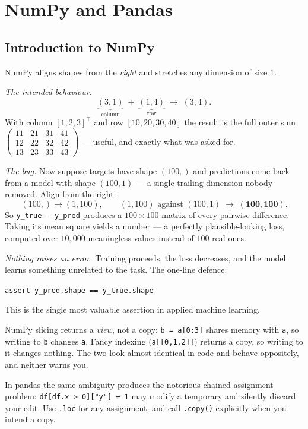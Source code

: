 \section{NumPy and Pandas}
\subsection{Introduction to NumPy}

\begin{workedexample}
NumPy aligns shapes from the \emph{right} and stretches any dimension of size
$1$.

\emph{The intended behaviour.}
\[
  \underbrace{(3,1)}_{\text{column}} \;+\; \underbrace{(1,4)}_{\text{row}}
  \;\longrightarrow\; (3,4).
\]
With column $[1,2,3]^{\!\top}$ and row $[10,20,30,40]$ the result is the full
outer sum
$\left(\begin{smallmatrix}11&21&31&41\\12&22&32&42\\13&23&33&43
\end{smallmatrix}\right)$ --- useful, and exactly what was asked for.

\emph{The bug.} Now suppose targets have shape $(100,)$ and predictions come
back from a model with shape $(100,1)$ --- a single trailing dimension nobody
removed. Align from the right:
\[
  (100,) \rightarrow (1,100),
  \qquad
  (1,100) \text{ against } (100,1)
  \;\longrightarrow\; \mathbf{(100,100)} .
\]
So \texttt{y\_true - y\_pred} produces a $100\times100$ matrix of every
pairwise difference. Taking its mean square yields a number --- a perfectly
plausible-looking loss, computed over $10{,}000$ meaningless values instead of
$100$ real ones.

\emph{Nothing raises an error.} Training proceeds, the loss decreases, and the
model learns something unrelated to the task. The one-line defence:
\begin{center}
\texttt{assert y\_pred.shape == y\_true.shape}
\end{center}
This is the single most valuable assertion in applied machine learning.
\end{workedexample}

\begin{cautionbox}
NumPy slicing returns a \emph{view}, not a copy: \texttt{b = a[0:3]} shares
memory with \texttt{a}, so writing to \texttt{b} changes \texttt{a}. Fancy
indexing (\texttt{a[[0,1,2]]}) returns a copy, so writing to it changes
nothing. The two look almost identical in code and behave oppositely, and
neither warns you.

In pandas the same ambiguity produces the notorious chained-assignment problem:
\texttt{df[df.x > 0]["y"] = 1} may modify a temporary and silently discard your
edit. Use \texttt{.loc} for any assignment, and call \texttt{.copy()} explicitly
when you intend a copy.
\end{cautionbox}

